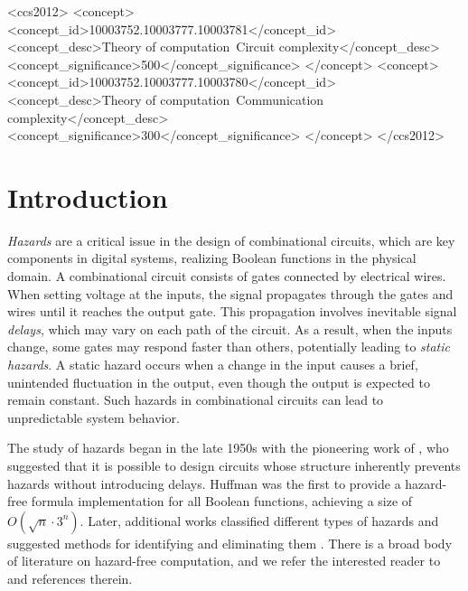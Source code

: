 \documentclass[acmsmall, nonacm, authorversion]{acmart}
\begin{document}
\begin{CCSXML}
<ccs2012>
   <concept>
       <concept_id>10003752.10003777.10003781</concept_id>
       <concept_desc>Theory of computation~Circuit complexity</concept_desc>
       <concept_significance>500</concept_significance>
       </concept>
   <concept>
       <concept_id>10003752.10003777.10003780</concept_id>
       <concept_desc>Theory of computation~Communication complexity</concept_desc>
       <concept_significance>300</concept_significance>
       </concept>
 </ccs2012>
\end{CCSXML}




\maketitle

\section{Introduction}  
\emph{Hazards} are a critical issue in the design of combinational circuits, which are key components in digital systems, realizing Boolean functions in the physical domain. A combinational circuit consists of gates connected by electrical wires. When setting voltage at the inputs, the signal propagates through the gates and wires until it reaches the output gate. This propagation involves inevitable signal \emph{delays}, which may vary on each path of the circuit. As a result, when the inputs change, some gates may respond faster than others, potentially leading to \emph{static hazards}. A static hazard occurs when a change in the input causes a brief, unintended fluctuation in the output, even though the output is expected to remain constant. Such hazards in combinational circuits can lead to unpredictable system behavior.

The study of hazards began in the late 1950s with the pioneering work of \cite{Huf57}, who suggested that it is possible to design circuits whose structure inherently prevents hazards without introducing delays. Huffman was the first to provide a hazard-free formula implementation for all Boolean functions, achieving a size of $O(\sqrt{n}\cdot 3^n)$. Later, additional works classified different types of hazards and suggested methods for identifying and eliminating them \cite{ung59, mcc62}. There is a broad body of literature on hazard-free computation, and we refer the interested reader to \cite{McC86, IKL+19} and references therein.
\end{document}
